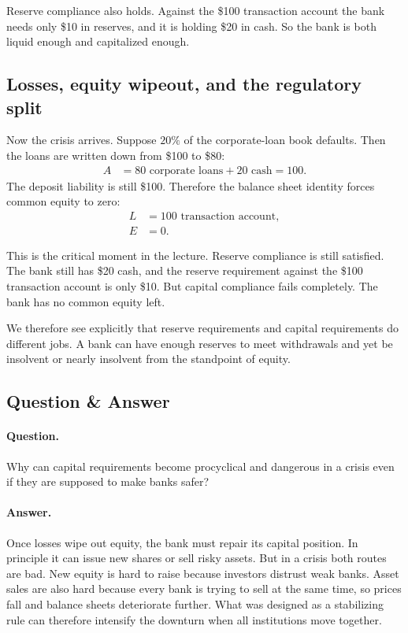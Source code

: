Reserve compliance also holds. Against the \$100 transaction account the bank needs only \$10 in reserves, and it is holding \$20 in cash. So the bank is both liquid enough and capitalized enough.

\subsection{Losses, equity wipeout, and the regulatory split}

Now the crisis arrives. Suppose \(20\%\) of the corporate-loan book defaults. Then the loans are written down from \$100 to \$80:
\begin{align}
A &= 80 \text{ corporate loans} + 20 \text{ cash} = 100.
\end{align}
The deposit liability is still \$100. Therefore the balance sheet identity forces common equity to zero:
\begin{align}
L &= 100 \text{ transaction account}, \\
E &= 0.
\end{align}

This is the critical moment in the lecture. Reserve compliance is still satisfied. The bank still has \$20 cash, and the reserve requirement against the \$100 transaction account is only \$10. But capital compliance fails completely. The bank has no common equity left.

We therefore see explicitly that reserve requirements and capital requirements do different jobs. A bank can have enough reserves to meet withdrawals and yet be insolvent or nearly insolvent from the standpoint of equity.

\subsection{Question \& Answer}

\paragraph{Question.} Why can capital requirements become procyclical and dangerous in a crisis even if they are supposed to make banks safer?

\paragraph{Answer.} Once losses wipe out equity, the bank must repair its capital position. In principle it can issue new shares or sell risky assets. But in a crisis both routes are bad. New equity is hard to raise because investors distrust weak banks. Asset sales are also hard because every bank is trying to sell at the same time, so prices fall and balance sheets deteriorate further. What was designed as a stabilizing rule can therefore intensify the downturn when all institutions move together.

